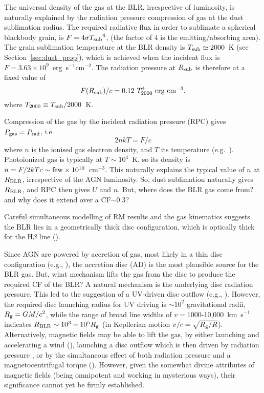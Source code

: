 \documentclass[a4paper,fleqn,usenatbib]{mnras}
\newcommand{\Tsub}{\mbox{$T_{\rm sub}$}}
\begin{document}
The universal density of the gas at the BLR, irrespective of luminosity, is naturally explained by 
the radiation pressure compression of gas at the dust sublimation radius.
The required radiative flux in order to sublimate a spherical blackbody grain, is 
$F= 4\sigma \Tsub^4$, (the factor of 4 is the emitting/absorbing area). 
The grain sublimation temperature at the BLR density is
$\Tsub\simeq 2000$~K (see Section~\ref{sec:dust_prop}), which is achieved when the incident flux is $F=3.63\times 10^9$~erg~s$^{-1}$cm$^{-2}$. The radiation pressure at $R_{\rm sub}$ is therefore at a fixed
value of
\begin{equation}
F(R_{\rm sub})/c=0.12~T_{2000}^4~{\rm erg~cm}^{-3},
\end{equation}
where $T_{2000}\equiv \Tsub/2000$~K. 

Compression of the gas by the incident radiation pressure (RPC) gives $P_{\rm gas}=P_{\rm rad}$, i.e.
\begin{equation} 
2nkT= F/c
\end{equation}
where $n$ is the ionised gas electron density, and $T$ its temperature (e.g.\ \citealt{paperI}). 
Photoionized 
gas is typically at $T\sim 10^4$~K, so its density is $n=F/2kTc \sim {\rm few}\times 10^{10}$~cm$^{-3}$. 
This naturally explains the typical value of $n$ at $R_{\rm BLR}$, irrespective of the AGN luminosity.
So, dust sublimation naturally gives $R_{\rm BLR}$, and RPC then gives $U$ and $n$. But, where does the BLR gas come from?  and why does it extend over a CF$\sim 0.3$?

Careful simultaneous modelling of RM results and the gas kinematics suggests the BLR lies in a geometrically thick disc configuration, which is optically thick for the H$\beta$ line (\citealt{Pancoast14, Grier17}).

Since AGN are powered by accretion of gas, most likely in a thin disc configuration (e.g., \citealt{Shields78, Capellupo16}), the accretion disc (AD) is the most plausible source for the BLR gas. But, what mechanism lifts
the gas from the disc to produce the required CF of the BLR?
A natural mechanism is the underlying disc radiation pressure. This led to the suggestion of a UV-driven disc outflow 
(e.g., \citealt*{Shlosman85, Murray95, Proga04}).
However, the required disc launching radius for UV driving is $\sim 10^2$ gravitational radii, $R_{\rm g}=GM/c^2$, while the range
of broad line widths of $v=$1000-10,000~km~s$^{-1}$ indicates $R_{\rm BLR}\sim 10^3-10^5R_{\rm g}$ (in Kepllerian motion
$v/c=\sqrt{R_{\rm g}/R}$). 
Alternatively, magnetic fields may be able to lift the gas, by either launching and accelerating 
a wind (\citealt*{Emmering92, Lovelace98}), launching a disc outflow
which is then driven by radiation pressure \citep{Konigl94}, or by the simultaneous effect of both radiation pressure
and a magnetocentrifugal torque (\citealt{Everett05, Keating12}). However, given the somewhat divine attributes of magnetic fields (being omnipotent and working in mysterious ways), their significance cannot yet be firmly established. 
\end{document}
